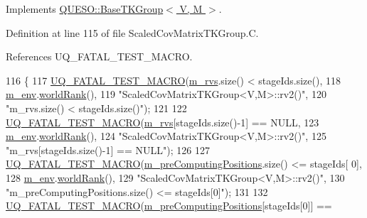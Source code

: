 Implements \hyperlink{class_q_u_e_s_o_1_1_base_t_k_group_a35eaf213217ec41a9d85b957db01a9ff}{Q\-U\-E\-S\-O\-::\-Base\-T\-K\-Group$<$ V, M $>$}.



Definition at line 115 of file Scaled\-Cov\-Matrix\-T\-K\-Group.\-C.



References U\-Q\-\_\-\-F\-A\-T\-A\-L\-\_\-\-T\-E\-S\-T\-\_\-\-M\-A\-C\-R\-O.


\begin{DoxyCode}
116 \{
117   \hyperlink{_defines_8h_a56d63d18d0a6d45757de47fcc06f574d}{UQ\_FATAL\_TEST\_MACRO}(\hyperlink{class_q_u_e_s_o_1_1_base_t_k_group_a87c6b02ea45ab3de634c22afa58f53a5}{m\_rvs}.size() < stageIds.size(),
118                       \hyperlink{class_q_u_e_s_o_1_1_base_t_k_group_a2bce5e8aa5c844d4332a0e73cf00a1f9}{m\_env}.\hyperlink{class_q_u_e_s_o_1_1_base_environment_a78b57112bbd0e6dd0e8afec00b40ffa7}{worldRank}(),
119                       \textcolor{stringliteral}{"ScaledCovMatrixTKGroup<V,M>::rv2()"},
120                       \textcolor{stringliteral}{"m\_rvs.size() < stageIds.size()"});
121 
122   \hyperlink{_defines_8h_a56d63d18d0a6d45757de47fcc06f574d}{UQ\_FATAL\_TEST\_MACRO}(\hyperlink{class_q_u_e_s_o_1_1_base_t_k_group_a87c6b02ea45ab3de634c22afa58f53a5}{m\_rvs}[stageIds.size()-1] == NULL,
123                       \hyperlink{class_q_u_e_s_o_1_1_base_t_k_group_a2bce5e8aa5c844d4332a0e73cf00a1f9}{m\_env}.\hyperlink{class_q_u_e_s_o_1_1_base_environment_a78b57112bbd0e6dd0e8afec00b40ffa7}{worldRank}(),
124                       \textcolor{stringliteral}{"ScaledCovMatrixTKGroup<V,M>::rv2()"},
125                       \textcolor{stringliteral}{"m\_rvs[stageIds.size()-1] == NULL"});
126 
127   \hyperlink{_defines_8h_a56d63d18d0a6d45757de47fcc06f574d}{UQ\_FATAL\_TEST\_MACRO}(\hyperlink{class_q_u_e_s_o_1_1_base_t_k_group_a93d7fe55e30a7c6f209b01cb8a67e322}{m\_preComputingPositions}.size() <= stageIds[
      0],
128                       \hyperlink{class_q_u_e_s_o_1_1_base_t_k_group_a2bce5e8aa5c844d4332a0e73cf00a1f9}{m\_env}.\hyperlink{class_q_u_e_s_o_1_1_base_environment_a78b57112bbd0e6dd0e8afec00b40ffa7}{worldRank}(),
129                       \textcolor{stringliteral}{"ScaledCovMatrixTKGroup<V,M>::rv2()"},
130                       \textcolor{stringliteral}{"m\_preComputingPositions.size() <= stageIds[0]"});
131 
132   \hyperlink{_defines_8h_a56d63d18d0a6d45757de47fcc06f574d}{UQ\_FATAL\_TEST\_MACRO}(\hyperlink{class_q_u_e_s_o_1_1_base_t_k_group_a93d7fe55e30a7c6f209b01cb8a67e322}{m\_preComputingPositions}[stageIds[0]] == 

\end{DoxyCode}
